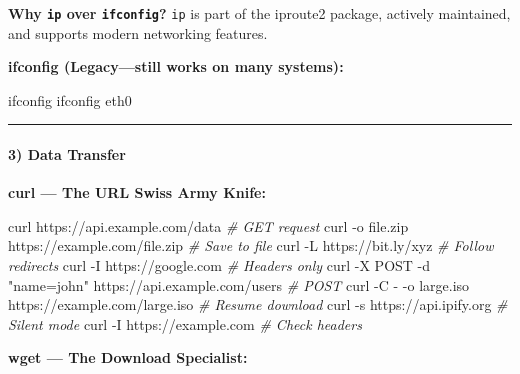 \documentclass[
  english,
  paper=a4,
  oneside  ,captions=tableheading
]{scrartcl}
\newenvironment{Shaded}{}{}
\newcommand{\AttributeTok}[1]{\textcolor[rgb]{0.49,0.56,0.16}{#1}}
\newcommand{\CommentTok}[1]{\textcolor[rgb]{0.38,0.63,0.69}{\textit{#1}}}
\newcommand{\ExtensionTok}[1]{#1}
\newcommand{\NormalTok}[1]{#1}
\newcommand{\StringTok}[1]{\textcolor[rgb]{0.25,0.44,0.63}{#1}}
\begin{document}
\textbf{Why \texttt{ip} over \texttt{ifconfig}?} \texttt{ip} is part of
the iproute2 package, actively maintained, and supports modern
networking features.

\textbf{ifconfig (Legacy---still works on many systems):}

\begin{Shaded}
\begin{Highlighting}[]
\ExtensionTok{ifconfig}
\ExtensionTok{ifconfig}\NormalTok{ eth0}
\end{Highlighting}
\end{Shaded}

\begin{center}\rule{0.5\linewidth}{0.5pt}\end{center}

\paragraph{3) Data Transfer}\label{data-transfer}

\textbf{curl --- The URL Swiss Army Knife:}

\begin{Shaded}
\begin{Highlighting}[]
\ExtensionTok{curl}\NormalTok{ https://api.example.com/data                }\CommentTok{\# GET request}
\ExtensionTok{curl} \AttributeTok{{-}o}\NormalTok{ file.zip https://example.com/file.zip    }\CommentTok{\# Save to file}
\ExtensionTok{curl} \AttributeTok{{-}L}\NormalTok{ https://bit.ly/xyz                       }\CommentTok{\# Follow redirects}
\ExtensionTok{curl} \AttributeTok{{-}I}\NormalTok{ https://google.com                       }\CommentTok{\# Headers only}
\ExtensionTok{curl} \AttributeTok{{-}X}\NormalTok{ POST }\AttributeTok{{-}d} \StringTok{"name=john"}\NormalTok{ https://api.example.com/users  }\CommentTok{\# POST}
\ExtensionTok{curl} \AttributeTok{{-}C} \AttributeTok{{-}} \AttributeTok{{-}o}\NormalTok{ large.iso https://example.com/large.iso       }\CommentTok{\# Resume download}
\ExtensionTok{curl} \AttributeTok{{-}s}\NormalTok{ https://api.ipify.org                    }\CommentTok{\# Silent mode}
\ExtensionTok{curl} \AttributeTok{{-}I}\NormalTok{ https://example.com                      }\CommentTok{\# Check headers}
\end{Highlighting}
\end{Shaded}

\textbf{wget --- The Download Specialist:}
\end{document}
